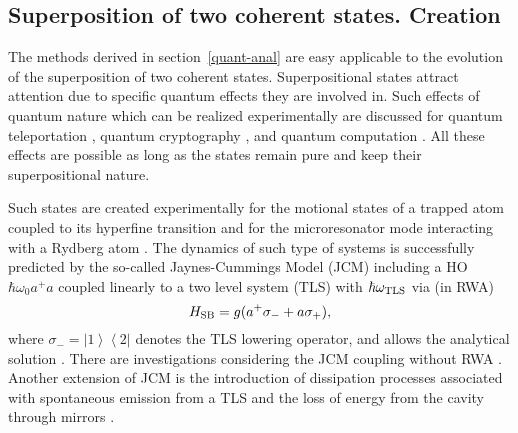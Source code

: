 \documentclass[12pt,twoside,a4paper]{report}
\begin{document}
\subsection{Superposition of two coherent states. Creation\label{quant-JCM}}
The methods derived in section~\ref{quant-anal}  are easy applicable to the evolution
of the superposition of two coherent states.  Superpositional states
attract attention due to
specific quantum effects they are involved in.  Such effects
of quantum nature which can be  realized experimentally  
are discussed for
quantum teleportation \cite{benn93,bosc98}, 
quantum cryptography \cite{mull97}, and quantum computation 
\cite{3,stea98}.
All these effects are possible as long as the states remain pure and keep their
superpositional nature.


Such states are created experimentally for the motional states of
a trapped atom \cite{6,meek96} coupled to its hyperfine transition and
for the microresonator mode interacting with a Rydberg atom
\cite{brun96}.  The dynamics of such type of systems is successfully
predicted by the so-called Jaynes-Cummings Model (JCM) \cite{jayn63}
including a HO $\hbar\omega_0 a^+a$ coupled linearly to a
two level system (TLS) with $\hbar\omega_{\rm TLS}$ via (in RWA)
\begin{equation}
H
_{\rm 
  SB}
       =
           g
             (
                a^+\sigma_-
              + a  \sigma_+   
             ),
\label{JCM-coupling}
\end{equation}
where 
$\sigma_-
          =
             \left| 1 \right> 
             \left< 2 \right|$ 
denotes the TLS
  lowering operator, and allows the analytical solution \cite{jayn63}.
There are investigations 
considering the JCM coupling without RWA \cite{cris91}.  
Another extension of JCM is the introduction of
dissipation processes \cite{fari99,agar74} 
associated with spontaneous emission from a TLS 
and the loss of energy from the cavity through mirrors \cite{puri86,cira91}.


\end{document}
